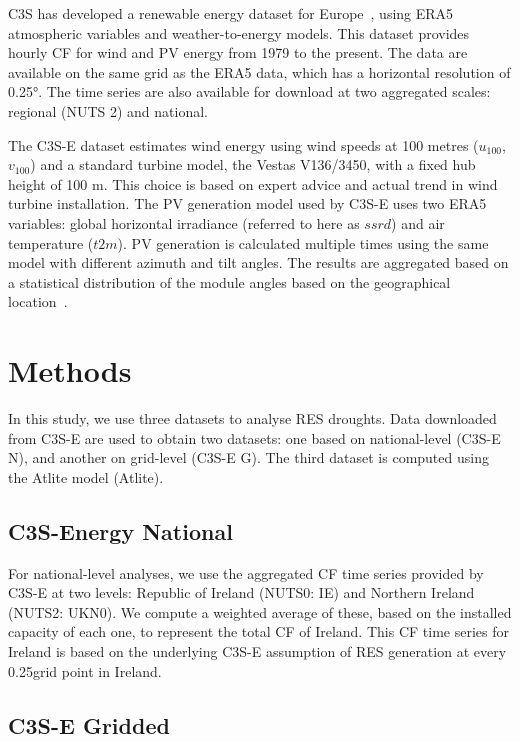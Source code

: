 \documentclass[a4paper, 11pt]{article}
\begin{document}
C3S has developed a renewable energy dataset for Europe~\cite{dubus2023energy}, using ERA5 atmospheric variables and weather-to-energy models. This dataset provides hourly CF for wind and PV energy from 1979 to the present. The data are available on the same grid as the ERA5 data, which has a horizontal resolution of 0.25°. The time series are also available for download at two aggregated scales: regional (NUTS 2) and national.

The C3S-E dataset estimates wind energy using wind speeds at 100 metres ($u_{100}$, $v_{100}$) and a standard turbine model, the Vestas V136/3450, with a fixed hub height of 100 m. This choice is based on expert advice and actual trend in wind turbine installation. The PV generation model used by C3S-E uses two ERA5 variables: global horizontal irradiance (referred to here as $ssrd$) and air temperature ($t2m$). PV generation is calculated multiple times using the same model with different azimuth and tilt angles. The results are aggregated based on a statistical distribution of the module angles based on the geographical location~\cite{saintdrenan2018solar}.

\section{Methods}
\label{sec:Methods}

In this study, we use three datasets to analyse RES droughts. Data downloaded from C3S-E are used to obtain two datasets: one based on national-level (C3S-E N), and another on grid-level (C3S-E G). The third dataset is computed using the Atlite model (Atlite).

\subsection{C3S-Energy National}
\label{sec:c3se_n}

For national-level analyses, we use the aggregated CF time series provided by C3S-E at two levels: Republic of Ireland (NUTS0: IE) and Northern Ireland (NUTS2: UKN0). We compute a weighted average of these, based on the installed capacity of each one, to represent the total CF of Ireland. This CF time series for Ireland is based on the underlying C3S-E assumption of RES generation at every 0.25\textdegree grid point in Ireland.

\subsection{C3S-E Gridded}
\label{sec:c3se_g}
\end{document}
